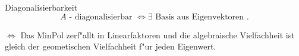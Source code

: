 \documentclass[class=article, crop=false]{standalone}
\begin{document}
\begin{zettel}{Diagonalisierbarkeit}
\[
    A \text{ - diagonalisierbar } \iff \exists \text{ Basis aus Eigenvektoren }
.\]

$\iff$  Das MinPol zerf"allt in Linearfaktoren und die algebraische Vielfachheit ist gleich der geometischen Vielfachheit f"ur jeden Eigenwert.

\end{zettel}
\end{document}
